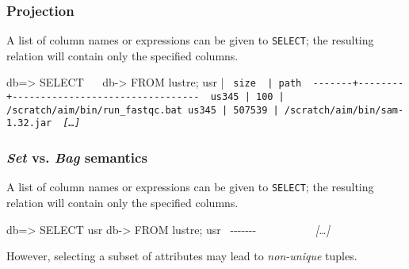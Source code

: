 \documentclass[english,serif,mathserif]{beamer}
\begin{document}




\begin{frame}[fragile]
  \frametitle{Projection}

  A list of column names or expressions can be given to \texttt{SELECT}; the
  resulting relation will contain only the specified columns.

  \+
\begin{sql}[basicstyle=\ttfamily\tiny]
db=> SELECT ~~
db-> FROM lustre;
  usr  |  ~\tt size~  |              path
~-{}-{}-{}-{}-{}-{}-{}+{}-{}-{}-{}-{}-{}-{}-{}-{}+{}-{}-{}-{}-{}-{}-{}-{}-{}-{}-{}-{}-{}-{}-{}-{}-{}-{}-{}-{}-{}-{}-{}-{}-{}-{}-{}-{}-{}-{}-{}-{}-{}-{}~
 us345 |    100 | /scratch/aim/bin/run_fastqc.bat
 us345 | 507539 | /scratch/aim/bin/sam-1.32.jar
 ~{\em [\ldots]}~
\end{sql}
\end{frame}


\begin{frame}[fragile]
  \frametitle{\emph{Set} vs. \emph{Bag} semantics}

  A list of column names or expressions can be given to \texttt{SELECT}; the
  resulting relation will contain only the specified columns.

  \+
\begin{sql}[basicstyle=\ttfamily\tiny]
db=> SELECT usr
db-> FROM lustre;
  usr
~-{}-{}-{}-{}-{}-{}-{}~
 ~~
 ~~
 ~~
 ~{\em [\ldots]}~
\end{sql}

  However, \alert{selecting a subset of attributes may lead to \emph{non-unique} tuples.}
\end{frame}
\end{document}
